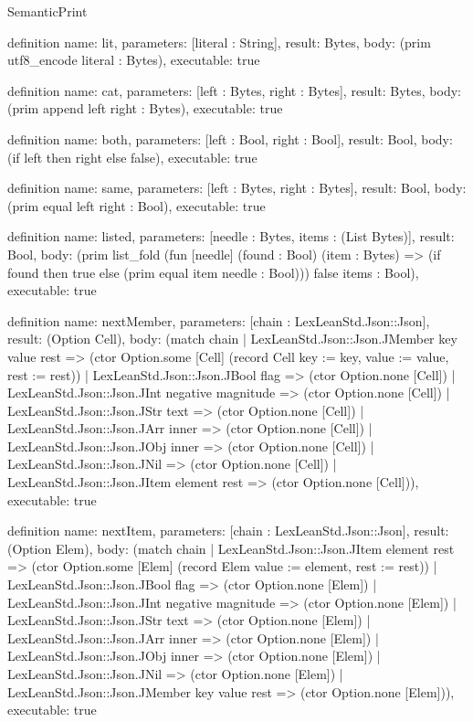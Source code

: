 \begin{lexlean}{SemanticPrint}
\begin{semanticmodule}
definition{
  name: lit,
  parameters: [literal : String],
  result: Bytes,
  body: (prim utf8_encode literal : Bytes),
  executable: true
}

definition{
  name: cat,
  parameters: [left : Bytes, right : Bytes],
  result: Bytes,
  body: (prim append left right : Bytes),
  executable: true
}

definition{
  name: both,
  parameters: [left : Bool, right : Bool],
  result: Bool,
  body: (if left then right else false),
  executable: true
}

definition{
  name: same,
  parameters: [left : Bytes, right : Bytes],
  result: Bool,
  body: (prim equal left right : Bool),
  executable: true
}

definition{
  name: listed,
  parameters: [needle : Bytes, items : (List Bytes)],
  result: Bool,
  body: (prim list_fold (fun [needle] (found : Bool) (item : Bytes) => (if found then true else (prim equal item needle : Bool))) false items : Bool),
  executable: true
}

definition{
  name: nextMember,
  parameters: [chain : LexLeanStd.Json::Json],
  result: (Option Cell),
  body: (match chain
    | LexLeanStd.Json::Json.JMember key value rest => (ctor Option.some [Cell] (record Cell {key := key, value := value, rest := rest}))
    | LexLeanStd.Json::Json.JBool flag => (ctor Option.none [Cell])
    | LexLeanStd.Json::Json.JInt negative magnitude => (ctor Option.none [Cell])
    | LexLeanStd.Json::Json.JStr text => (ctor Option.none [Cell])
    | LexLeanStd.Json::Json.JArr inner => (ctor Option.none [Cell])
    | LexLeanStd.Json::Json.JObj inner => (ctor Option.none [Cell])
    | LexLeanStd.Json::Json.JNil => (ctor Option.none [Cell])
    | LexLeanStd.Json::Json.JItem element rest => (ctor Option.none [Cell])),
  executable: true
}

definition{
  name: nextItem,
  parameters: [chain : LexLeanStd.Json::Json],
  result: (Option Elem),
  body: (match chain
    | LexLeanStd.Json::Json.JItem element rest => (ctor Option.some [Elem] (record Elem {value := element, rest := rest}))
    | LexLeanStd.Json::Json.JBool flag => (ctor Option.none [Elem])
    | LexLeanStd.Json::Json.JInt negative magnitude => (ctor Option.none [Elem])
    | LexLeanStd.Json::Json.JStr text => (ctor Option.none [Elem])
    | LexLeanStd.Json::Json.JArr inner => (ctor Option.none [Elem])
    | LexLeanStd.Json::Json.JObj inner => (ctor Option.none [Elem])
    | LexLeanStd.Json::Json.JNil => (ctor Option.none [Elem])
    | LexLeanStd.Json::Json.JMember key value rest => (ctor Option.none [Elem])),
  executable: true
}


\end{semanticmodule}
\end{lexlean}
